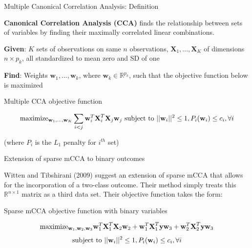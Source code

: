 \documentclass[ignorenonframetext,]{beamer}
\begin{document}
\begin{frame}{Multiple Canonical Correlation Analysis: Definition}
\protect\hypertarget{multiple-canonical-correlation-analysis-definition}{}

\textbf{Canonical Correlation Analysis (CCA)} finds the relationship
between sets of variables by finding their maximally correlated linear
combinations.

\textbf{Given}: \(K\) sets of observations on same \(n\) observations,
\(\textbf{X}_1,...,\textbf{X}_K\) of dimensions \(n \times p_k\), all
standardized to mean zero and SD of one

\textbf{Find}: Weights \(\textbf{w}_1,...,\textbf{w}_k\), where
\(\textbf{w}_k \in \mathbb{R}^{p_k}\), such that the objective function
below is maximized

\begin{block}{Multiple CCA objective function}

\begin{equation} \label{eq:penalized_smcca}
    \text{maximize}_{\textbf{w}_1,...,\textbf{w}_K} \sum_{i<j} \textbf{w}_i^T\textbf{X}_i^T\textbf{X}_j\textbf{w}_j \text{ subject to }||\textbf{w}_i||^2 \leq 1, P_i(\textbf{w}_i) \leq c_i, \forall i \notag
\end{equation}

\begin{center}
(where $P_i$ is the $L_1$ penalty for $i^{th}$ set)
\end{center}

\end{block}

\end{frame}

\begin{frame}{Extension of sparse mCCA to binary outcomes}
\protect\hypertarget{extension-of-sparse-mcca-to-binary-outcomes}{}

Witten and Tibshirani (2009) suggest an extension of sparse mCCA that
allows for the incorporation of a two-class outcome. Their method simply
treats this \(\mathbb{R}^{n\times1}\) matrix as a third data set. Their
objective function takes the form:

\begin{block}{Sparse mCCA objective function with binary variables}

\begin{equation} \label{eq:penalized_smcca_with_binary}
\text{maximize}_{\textbf{w}_1, \textbf{w}_2, \textbf{w}_3} \textbf{w}_1^T\textbf{X}_1^T\textbf{X}_2\textbf{w}_2 +
    \textbf{w}_1^T\textbf{X}_1^T\textbf{y}\textbf{w}_3 +
    \textbf{w}_2^T\textbf{X}_2^T\textbf{y}\textbf{w}_3 \notag \end{equation}
\begin{equation} \text{subject to }||\textbf{w}_i||^2 \leq 1, P_i(\textbf{w}_i) \leq c_i, \forall i \notag
\end{equation}

\end{block}

\end{frame}
\end{document}
